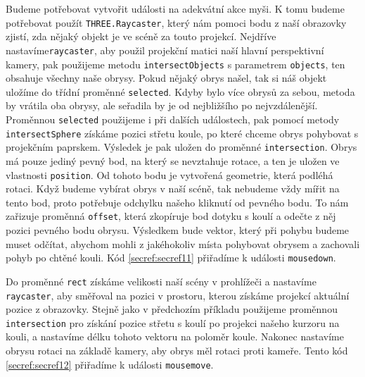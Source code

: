 \documentclass[czech,bachelor,dept420,male,cpdeclaration]{diploma}
\begin{document}
\begin{minipage}{\linewidth}
 
\end{minipage}

Budeme potřebovat vytvořit události na adekvátní akce myši. K tomu budeme potřebovat použít \texttt{THREE.Raycaster}, který nám pomoci bodu z naší obrazovky zjistí, zda nějaký objekt je ve scéně za touto projekcí. Nejdříve nastavíme\texttt{raycaster}, aby použil projekční matici naší hlavní perspektivní kamery, pak použijeme metodu \texttt{intersectObjects} s parametrem \texttt{objects}, ten obsahuje všechny naše obrysy. Pokud nějaký obrys našel, tak si náš objekt uložíme do třídní proměnné \texttt{selected}. Kdyby bylo více obrysů za sebou, metoda by vrátila oba obrysy, ale seřadila by je od nejbližšího po nejvzdálenější. Proměnnou \texttt{selected} použijeme i při dalších událostech, pak pomocí metody \texttt{intersectSphere} získáme pozici střetu koule, po které chceme obrys pohybovat s projekčním paprskem. Výsledek je pak uložen do proměnné \texttt{intersection}. Obrys má pouze jediný pevný bod, na který se nevztahuje rotace, a ten je uložen ve vlastnosti \texttt{position}. Od tohoto bodu je vytvořená geometrie, která podléhá rotaci. Když budeme vybírat obrys v naší scéně, tak nebudeme vždy mířit na tento bod, proto potřebuje odchylku našeho kliknutí od pevného bodu. To nám zařizuje proměnná \texttt{offset}, která zkopíruje bod dotyku s koulí a odečte z něj pozici pevného bodu obrysu. Výsledkem bude vektor, který při pohybu budeme muset odčítat, abychom mohli z jakéhokoliv místa pohybovat obrysem a zachovali pohyb po chtěné kouli. Kód \ref{secref:secref11} přiřadíme k události \texttt{mousedown}.



Do proměnné \texttt{rect} získáme velikosti naší scény v prohlížeči a nastavíme \texttt{raycaster}, aby směřoval na pozici v prostoru, kterou získáme projekcí aktuální pozice z obrazovky. Stejně jako v předchozím příkladu použijeme proměnnou \texttt{intersection} pro získání pozice střetu s koulí po projekci našeho kurzoru na kouli, a nastavíme délku tohoto vektoru na poloměr koule. Nakonec nastavíme obrysu rotaci na základě kamery, aby obrys měl rotaci proti kameře. Tento kód \ref{secref:secref12} přiřadíme k události \texttt{mousemove}.    
\end{document}
